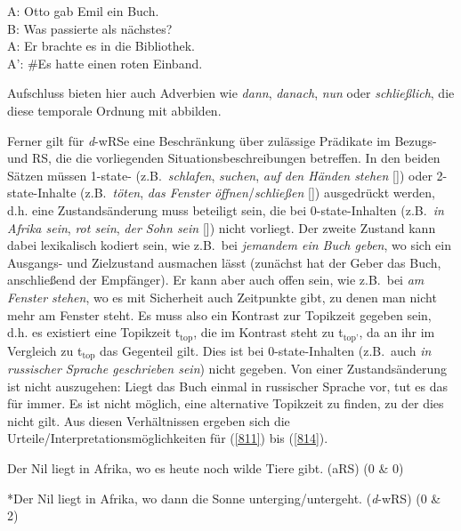 \begin{exe}
	\ex\label{810} 
	A: Otto gab Emil ein Buch.\\
	B: Was passierte als nächstes?\\
	A: Er brachte es in die Bibliothek.\\
	A': \#Es hatte einen roten Einband.
\end{exe}
Aufschluss bieten hier auch Adverbien wie \textit{dann}, \textit{danach}, \textit{nun} oder \textit{schließlich}, die diese temporale Ordnung mit abbilden.

Ferner gilt für \textit{d}-wRSe eine Beschränkung über zulässige Prädikate im Bezugs- und RS, die die vorliegenden Situationsbeschreibungen betreffen. In den beiden Sätzen müssen  1-state- (z.B.\ \textit{schlafen}, \textit{suchen}, \textit{auf den Händen stehen} [\citealt[81--95]{Klein1994}]) oder  2-state-Inhalte (z.B.\ \textit{töten}, \textit{das Fenster öffnen}/\textit{schließen} [\citealt[81--95]{Klein1994}]) ausgedrückt werden, d.h. eine Zustandsänderung muss beteiligt sein, die bei  0-state-Inhalten (z.B.\ \textit{in Afrika sein}, \textit{rot sein}, \textit{der Sohn sein} [\citealt[81--95]{Klein1994}]) nicht vorliegt. Der zweite Zustand kann dabei lexikalisch kodiert sein, wie z.B.\ bei \textit{jemandem ein Buch geben}, wo sich ein Ausgangs- und Zielzustand ausmachen lässt (zunächst hat der Geber das Buch, anschließend der Empfänger). Er kann aber auch offen sein, wie z.B.\ bei \textit{am Fenster stehen}, wo es mit Sicherheit auch Zeitpunkte gibt, zu denen man nicht mehr am Fenster steht. Es muss also ein Kontrast zur Topikzeit gegeben sein, d.h. es existiert eine Topikzeit t$_{\textrm{top}}$, die im Kontrast steht zu t$_{\textrm{top'}}$, da an ihr im Vergleich zu t$_{\textrm{top}}$ das Gegenteil gilt. Dies ist bei 0-state-Inhalten (z.B.\ auch \textit{in russischer Sprache geschrieben sein}) nicht gegeben. Von einer Zustandsänderung ist nicht auszugehen: Liegt das Buch einmal in russischer Sprache vor, tut es das für immer. Es ist nicht möglich, eine alternative Topikzeit zu finden, zu der dies nicht gilt. Aus diesen Verhältnissen ergeben sich die Urteile/Interpretationsmöglichkeiten für (\ref{811}) bis (\ref{814}).

\begin{exe}
	\ex\label{811} 
	Der Nil liegt in Afrika, wo es heute noch wilde Tiere gibt. (aRS) (0 \& 0)
\end{exe}

\begin{exe}
	\ex\label{812} 
	*Der Nil liegt in Afrika, wo dann die Sonne unterging/untergeht. (\textit{d}-wRS) (0 \& 2)
\end{exe}

